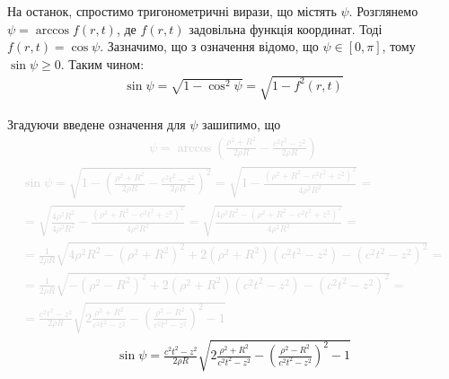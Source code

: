 На останок, спростимо тригонометричні вирази, що містять $ \psi $. Розглянемо 
$ \psi = \arccos f(r,t) $, де $ f(r,t) $ задовільна функція координат. 
Тоді $ f(r,t) = \cos \psi $. Зазначимо, що з означення відомо, що 
$ \psi \in \left[ 0, \pi \right] $, тому $ \sin \psi \geq 0 $. Таким чином:
%
\begin{equation*} \begin{aligned}
\sin \psi = \sqrt{1 - \cos^2 \psi } = \sqrt{1 - f^2(r,t)}
\end{aligned} \end{equation*}

Згадуючи введене означення для $ \psi $ зашипимо, що
%
\textcolor{lightgray}{ \begin{equation*} \begin{aligned}
\psi = \arccos \left( \frac{\rho^2 + R^2}{2 \rho R} - 
\frac{c^2 t^2 - z^2}{2 \rho R} \right)
\end{aligned} \end{equation*} }
%
\textcolor{lightgray}{ \begin{equation*} \begin{aligned}
\sin \psi = \sqrt{1 - \left( \frac{\rho^2 + R^2}{2 \rho R} - 
\frac{c^2 t^2 - z^2}{2 \rho R} \right)^2} = 
\sqrt{1 - \frac{\left( \rho^2 + R^2 - c^2 t^2 + z^2 \right)^2}
{4 \rho^2 R^2} } = \\ = \sqrt{\frac{4 \rho^2 R^2}{4 \rho^2 R^2} - 
\frac{\left( \rho^2 + R^2 - c^2 t^2 + z^2 \right)^2}{4 \rho^2 R^2} } =
\sqrt{\frac{4 \rho^2 R^2 - \left( \rho^2 + R^2 - c^2 t^2 + z^2 \right)^2}
{4 \rho^2 R^2}} = \\
= \frac{1}{2 \rho R} \sqrt{4 \rho^2 R^2 - \left( \rho^2 + R^2 \right)^2 +
2 \left( \rho^2 + R^2 \right) \left( c^2 t^2 - z^2 \right) - 
\left( c^2 t^2 - z^2 \right)^2} = \\
= \frac{1}{2 \rho R} \sqrt{- \left( \rho^2 - R^2 \right)^2 +
2 \left( \rho^2 + R^2 \right) \left( c^2 t^2 - z^2 \right) - 
\left( c^2 t^2 - z^2 \right)^2} = \\
= \frac{c^2 t^2 - z^2}{2 \rho R} \sqrt{2 \frac{\rho^2 + R^2 }{c^2 t^2 - z^2} - 
\left( \frac{\rho^2 - R^2 }{c^2 t^2 - z^2} \right)^2 - 1}
\end{aligned} \end{equation*} }
%
\begin{equation*} \begin{aligned}
\sin \psi = \frac{c^2 t^2 - z^2}{2 \rho R} 
\sqrt{2 \frac{\rho^2 + R^2 }{c^2 t^2 - z^2} - 
\left( \frac{\rho^2 - R^2 }{c^2 t^2 - z^2} \right)^2 - 1}
\end{aligned} \end{equation*}
